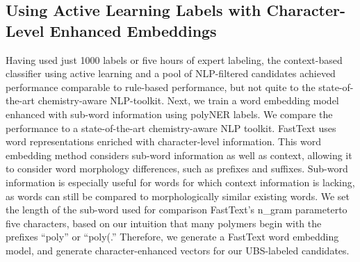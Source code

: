 \subsection{Using Active Learning Labels with Character-Level Enhanced Embeddings}
Having used just 1000 labels or five hours of expert labeling, the context-based classifier using active learning and a pool of NLP-filtered candidates achieved performance comparable to rule-based performance, 
but not quite to the state-of-the-art chemistry-aware NLP-toolkit.
Next, we train a word embedding model enhanced with sub-word information using polyNER labels. 
We compare the performance to a state-of-the-art chemistry-aware NLP toolkit. %
FastText uses word representations enriched with character-level information.
This word embedding method considers sub-word information as well as
context, allowing it to consider word morphology differences, such as prefixes
and suffixes. Sub-word information is especially useful for words for which
context information is lacking, as words can still be compared to morphologically similar
existing words. We set the length of the sub-word used for comparison\textemdash
FastText's n_gram parameter\textemdash to five characters, based on our intuition that
many polymers begin with the prefixes ``poly'' or ``poly(.'' 
Therefore, we generate a FastText word embedding model, and generate character-enhanced vectors for our UBS-labeled candidates.


